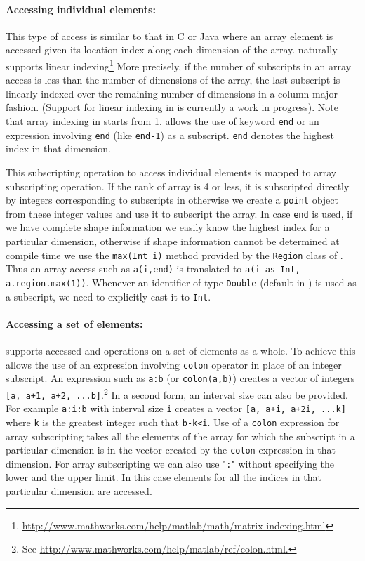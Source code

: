 \paragraph{Accessing individual elements:}  
This type of access is similar to that in
C or Java where an array element is accessed given its location index along
each dimension of the array. \matlab naturally supports linear
indexing\footnote{
\url{http://www.mathworks.com/help/matlab/math/matrix-indexing.html}}
More precisely, if the
number of subscripts in an array access is less than the number of dimensions
of the array, the last subscript is linearly indexed over the remaining number
of dimensions in a column-major fashion. (Support for linear indexing in
\mixten is currently a work in progress). Note that array indexing in
\matlab starts from 1. \matlab allows the use of keyword \verb|end| or an
expression involving \verb|end| (like \verb|end-1|) as a subscript. \verb|end|
denotes the highest index in that dimension. 

This subscripting operation to access individual elements is mapped to
\xten array subscripting operation. If the rank of array is 4 or less,
it is subscripted directly by integers corresponding to subscripts in
\matlab otherwise we create a \verb|point| object from these integer
values and use it to subscript the array. In case \verb|end| is used,
if we have complete shape information we easily know the highest index
for a particular dimension, otherwise if shape information cannot be
determined at compile time we use the \verb|max(Int i)| method provided
by the \verb|Region| class of \xten. Thus an array access such as 
\verb|a(i,end)| is translated to \verb|a(i as Int, a.region.max(1))|.
Whenever an identifier of type \verb|Double| (default in \matlab) is
used as a subscript, we need to explicitly cast it to \verb|Int|.  

\paragraph{Accessing a set of elements:}  \matlab supports accessed and
operations on a set of elements as a whole. To achieve this \matlab
allows the use of an expression involving \verb|colon| operator in place
of an integer subscript.  An expression such as \verb|a:b| (or
\verb|colon(a,b)|) creates a vector of 
integers \verb|[a, a+1, a+2, ...b]|.\footnote{See
\url{http://www.mathworks.com/help/matlab/ref/colon.html.}} In a second
form, an interval size can also be provided. For example \verb|a:i:b|
with interval size \verb|i| creates a vector \verb|[a, a+i, a+2i, ...k]| 
where \verb|k| is the greatest integer such that \verb|b-k<i|. Use
of a \verb|colon| expression for array subscripting takes all the
elements of the array for which the subscript in a particular dimension
is in the vector created by the \verb|colon| expression in that
dimension.  For array subscripting we can also use "\verb|:|" without
specifying the lower and the upper limit. In this case elements for all
the indices in that particular dimension are accessed. 

